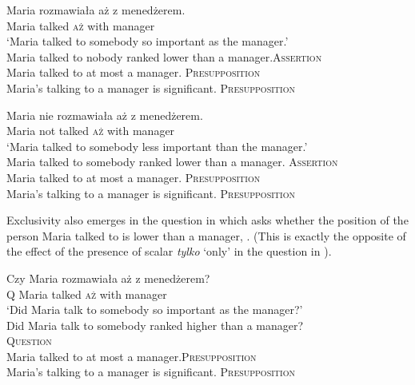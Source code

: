 \documentclass[output=paper,colorlinks,citecolor=brown]{langscibook}
\begin{document}
\ea\label{ex:tom:68}
\gll Maria rozmawiała aż z  menedżerem. \\         
Maria talked \textsc{aż} with  manager\\
\glt `Maria talked to somebody so important as the manager.’\\
\ea\label{ex:tom:68a} 
Maria talked to nobody ranked lower than a manager.\hfill \textsc{Assertion}\\
\ex\label{ex:tom:68b} 
Maria talked to at most a manager.  \hfill    \textsc{Presupposition}\\
\ex\label{ex:tom:68c} 
Maria’s talking to a manager is significant. \hfill \textsc{Presupposition}
\z 
\z 

\ea\label{ex:tom:69}
\gll Maria nie rozmawiała aż z menedżerem. \\     
Maria not talked \textsc{aż} with manager\\
\glt `Maria talked to somebody less important than the manager.’\\
\ea\label{ex:tom:69a}
Maria talked to somebody ranked lower than a manager. \hfill \textsc{Assertion}\\
\ex\label{ex:tom:69b} 
Maria talked to at most a manager. \hfill \textsc{Presupposition}\\
\ex\label{ex:tom:69c} 
Maria’s talking to a manager is significant. \hfill \textsc{Presupposition}
\z 
\z 

\noindent Exclusivity also emerges in the question in  which asks whether the position of the person Maria talked to is lower than a manager, . (This is exactly the opposite of the effect of the presence of scalar \textit{tylko} `only' in the question in ).

\ea\label{ex:tom:70}
\gll Czy Maria rozmawiała aż z menedżerem?  \\  
Q Maria talked \textsc{aż} with manager\\
\glt `Did Maria talk to somebody so important as the manager?’\\
\ea\label{ex:tom:70a} 
Did Maria talk to somebody ranked higher than a manager?\\\hfill \textsc{Question}\\
\ex\label{ex:tom:70b} 
Maria talked to at most a manager.\hfill \textsc{Presupposition}\\
\ex\label{ex:tom:70c} 
Maria’s talking to a manager is significant. \hfill \textsc{Presupposition}
\z 
\z 
\end{document}
